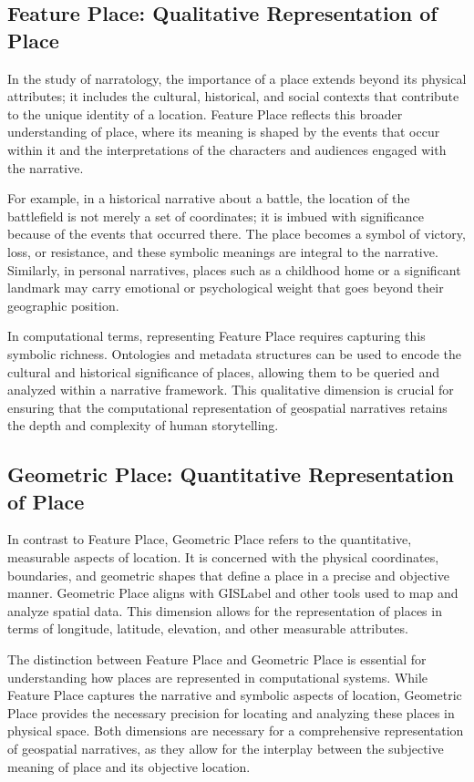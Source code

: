\subsection{Feature Place: Qualitative Representation of Place}\label{V-subsec:featurePlace}

In the study of narratology, the importance of a place extends beyond its physical attributes; it includes the cultural, historical, and social contexts that contribute to the unique identity of a location. Feature Place reflects this broader understanding of place, where its meaning is shaped by the events that occur within it and the interpretations of the characters and audiences engaged with the narrative.

For example, in a historical narrative about a battle, the location of the battlefield is not merely a set of coordinates; it is imbued with significance because of the events that occurred there. The place becomes a symbol of victory, loss, or resistance, and these symbolic meanings are integral to the narrative. Similarly, in personal narratives, places such as a childhood home or a significant landmark may carry emotional or psychological weight that goes beyond their geographic position.

In computational terms, representing Feature Place requires capturing this symbolic richness. Ontologies and metadata structures can be used to encode the cultural and historical significance of places, allowing them to be queried and analyzed within a narrative framework. This qualitative dimension is crucial for ensuring that the computational representation of geospatial narratives retains the depth and complexity of human storytelling.

\subsection{Geometric Place: Quantitative Representation of Place}\label{V-subsec:geometricPlace}

In contrast to Feature Place, Geometric Place refers to the quantitative, measurable aspects of location. It is concerned with the physical coordinates, boundaries, and geometric shapes that define a place in a precise and objective manner. Geometric Place aligns with \acrshort{GISLabel} and other tools used to map and analyze spatial data. This dimension allows for the representation of places in terms of longitude, latitude, elevation, and other measurable attributes.

The distinction between Feature Place and Geometric Place is essential for understanding how places are represented in computational systems. While Feature Place captures the narrative and symbolic aspects of location, Geometric Place provides the necessary precision for locating and analyzing these places in physical space. Both dimensions are necessary for a comprehensive representation of geospatial narratives, as they allow for the interplay between the subjective meaning of place and its objective location.

